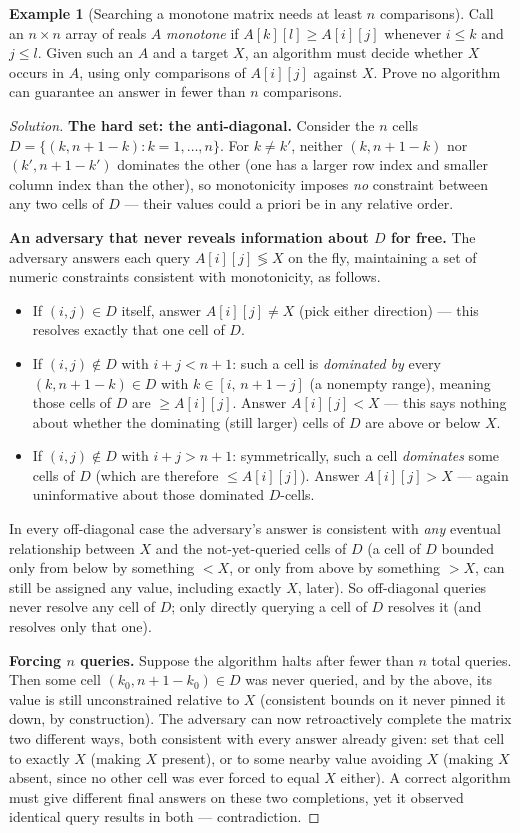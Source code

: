 \documentclass[11pt]{article}
\theoremstyle{definition}
\newtheorem{example}{Example}[section]
\begin{document}
\begin{example}[Searching a monotone matrix needs at least $n$ comparisons]
Call an $n\times n$ array of reals $A$ \emph{monotone} if $A[k][l]\ge A[i][j]$ whenever $i\le k$ and $j\le l$. Given such an $A$ and a target $X$, an algorithm must decide whether $X$ occurs in $A$, using only comparisons of $A[i][j]$ against $X$. Prove no algorithm can guarantee an answer in fewer than $n$ comparisons.
\end{example}
\begin{proof}[Solution]
\textbf{The hard set: the anti-diagonal.} Consider the $n$ cells $D=\{(k,n{+}1{-}k):k=1,\dots,n\}$. For $k\ne k'$, neither $(k,n{+}1{-}k)$ nor $(k',n{+}1{-}k')$ dominates the other (one has a larger row index and smaller column index than the other), so monotonicity imposes \emph{no} constraint between any two cells of $D$ — their values could a priori be in any relative order.

\textbf{An adversary that never reveals information about $D$ for free.} The adversary answers each query $A[i][j]\lessgtr X$ on the fly, maintaining a set of numeric constraints consistent with monotonicity, as follows.
\begin{itemize}
\item If $(i,j)\in D$ itself, answer $A[i][j]\ne X$ (pick either direction) — this resolves exactly that one cell of $D$.
\item If $(i,j)\notin D$ with $i+j<n+1$: such a cell is \emph{dominated by} every $(k,n{+}1{-}k)\in D$ with $k\in[i,\,n{+}1{-}j]$ (a nonempty range), meaning those cells of $D$ are $\ge A[i][j]$. Answer $A[i][j]<X$ — this says nothing about whether the dominating (still larger) cells of $D$ are above or below $X$.
\item If $(i,j)\notin D$ with $i+j>n+1$: symmetrically, such a cell \emph{dominates} some cells of $D$ (which are therefore $\le A[i][j]$). Answer $A[i][j]>X$ — again uninformative about those dominated $D$-cells.
\end{itemize}
In every off-diagonal case the adversary's answer is consistent with \emph{any} eventual relationship between $X$ and the not-yet-queried cells of $D$ (a cell of $D$ bounded only from below by something $<X$, or only from above by something $>X$, can still be assigned any value, including exactly $X$, later). So off-diagonal queries never resolve any cell of $D$; only directly querying a cell of $D$ resolves it (and resolves only that one).

\textbf{Forcing $n$ queries.} Suppose the algorithm halts after fewer than $n$ total queries. Then some cell $(k_0,n{+}1{-}k_0)\in D$ was never queried, and by the above, its value is still unconstrained relative to $X$ (consistent bounds on it never pinned it down, by construction). The adversary can now retroactively complete the matrix two different ways, both consistent with every answer already given: set that cell to exactly $X$ (making $X$ present), or to some nearby value avoiding $X$ (making $X$ absent, since no other cell was ever forced to equal $X$ either). A correct algorithm must give different final answers on these two completions, yet it observed identical query results in both — contradiction.


\end{proof}
\end{document}
